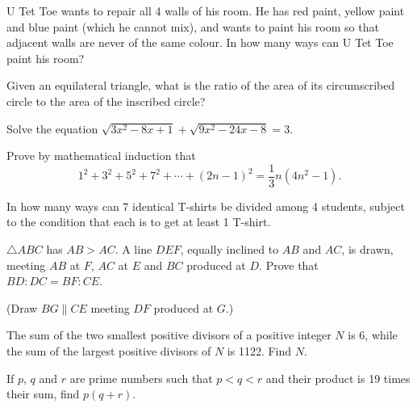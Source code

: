 \begin{problems}
    \problem U Tet Toe wants to repair all 4 walls of his room. He has red
    paint, yellow paint and blue paint (which he cannot mix), and wants to
    paint his room so that adjacent walls are never of the same colour. In how
    many ways can U Tet Toe paint his room?
    
    \problem Given an equilateral triangle, what is the ratio of the area of
    its circumscribed circle to the area of the inscribed circle?
    
    \problem Solve the equation $\sqrt{3x^2 - 8x + 1} + \sqrt{9x^2 - 24x - 8} =
    3$. 
    
    \problem Prove by mathematical induction that \[1^2 + 3^2 + 5^2 + 7^2 +
    \cdots + (2n - 1)^2 = \frac{1}{3}n(4n^2 - 1).\] 
    
    \problem In how many ways can 7 identical T-shirts be divided among 4
    students, subject to the condition that each is to get at least 1 T-shirt. 
    
    \problem $\triangle ABC$ has $AB > AC$. A line $DEF$, equally inclined to
    $AB$ and $AC$, is drawn, meeting $AB$ at $F$, $AC$ at $E$ and $BC$ produced
    at $D$. Prove that $BD : DC = BF : CE$.
    
    (\hint Draw $BG \parallel CE$ meeting $DF$ produced at $G$.) 
    
    \problem The sum of the two smallest positive divisors of a positive
    integer $N$ is 6, while the sum of the largest positive divisors of $N$ is
    1122. Find $N$. 
    
    \problem If $p$, $q$ and $r$ are prime numbers such that $p < q < r$ and
    their product is 19 times their sum, find $p(q + r)$.
\end{problems}
